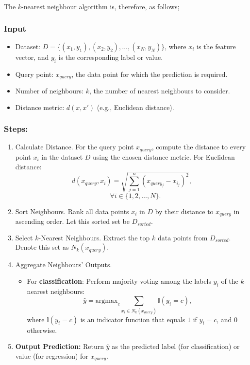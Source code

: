 		The $k$-nearest neighbour algorithm is, therefore, as follows;
		
		\bigskip
		\subsubsection{Input}
		\begin{itemize}
			\item Dataset: $D = \{(x_1, y_1), (x_2, y_2), \dots, (x_N, y_N)\}$, where $x_i$ is the feature vector, and $y_i$ is the corresponding label or value.
			\item Query point: $x_{query}$, the data point for which the prediction is required.
			\item Number of neighbours: $k$, the number of nearest neighbours to consider.
			\item Distance metric: $d(x, x')$ (e.g., Euclidean distance).
		\end{itemize}
		
		\subsubsection{Steps:}
			\begin{enumerate}
			
			\item Calculate Distance. For the query point $x_{query}$, compute the distance to every point $x_i$ in the dataset $D$ using the chosen distance metric. For Euclidean distance:
			$$
			d(x_{query}, x_i) = \sqrt{\sum_{j=1}^{n} (x_{query_j} - x_{i_j})^2},
			$$
			$$
			\quad \forall i \in \{1, 2, \dots, N\}.
			$$
			
			\item Sort Neighbours. Rank all data points $x_i$ in $D$ by their distance to $x_{query}$ in ascending order. Let this sorted set be $D_{sorted}$.
			
			\item Select $k$-Nearest Neighbours. Extract the top $k$ data points from $D_{sorted}$. Denote this set as $N_k(x_{query})$.
			
			\item Aggregate Neighbours' Outputs.
			\begin{itemize}
				\item For \textbf{classification}: Perform majority voting among the labels $y_i$ of the $k$-nearest neighbours:
				$$
				\hat{y} = \text{argmax}_c \sum_{x_i \in N_k(x_{query})} \mathbb{I}(y_i = c),
				$$
				where $\mathbb{I}(y_i = c)$ is an indicator function that equals $1$ if $y_i = c$, and $0$ otherwise.
				
				
			\end{itemize}
			
			\item \textbf{Output Prediction:}
			Return $\hat{y}$ as the predicted label (for classification) or value (for regression) for $x_{query}$.
			
		\end{enumerate}
		
